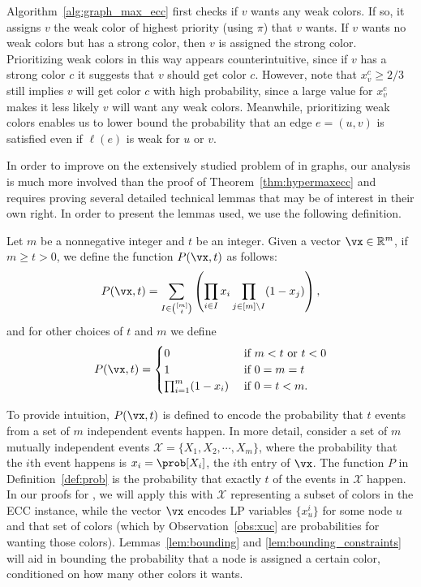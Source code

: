 Algorithm~\ref{alg:graph_max_ecc} first checks if $v$ wants any {weak} colors. If so, it assigns $v$ the weak color of highest priority (using $\pi$) that $v$ wants. If $v$ wants no weak colors but has a strong color, then $v$ is assigned the strong color. Prioritizing weak colors in this way appears counterintuitive, since if $v$ has a strong color $c$ it suggests that $v$ should get color $c$. However, note that $x_v^c \geq 2/3$ still implies $v$ will get color $c$ with high probability, since a large value for $x_v^c$ makes it less likely $v$ will want any weak colors. Meanwhile, prioritizing weak colors enables us to lower bound the probability that an edge $e = (u,v)$ is satisfied even if $\ell(e)$ is weak for $u$ or $v$.

In order to improve on the extensively studied problem of \maxecc{} in graphs, our analysis is much more involved than the proof of Theorem~\ref{thm:hypermaxecc} and requires proving several detailed technical lemmas that may be of interest in their own right. In order to present the lemmas used, we use the following definition.

\begin{definition}
	\label{def:prob}
	Let $m$ be a nonnegative integer and $t$ be an integer. Given a vector $\vx \in \mathbb{R}^m$, if $m \geq t > 0$, we define the function $P(\vx, t)$ as follows:
	\[
		P(\vx, t) = \sum_{I \in {[m] \choose t}} \left( \prod_{i \in I} x_i \prod_{j\in [m] \setminus I} (1 - x_j) \right),
	\]
	and for other choices of $t$ and $m$ we define
	\begin{equation*}
		P(\vx, t) = \begin{cases}
			0                         & \text{ if $m < t$ or $t < 0$} \\
			1                         & \text{ if $0 = m = t$}        \\
			\prod_{i = 1}^m (1 - x_i) & \text{ if $0 = t < m$.}
		\end{cases}
	\end{equation*}
\end{definition}
To provide intuition, $P(\vx,t)$ is defined to encode the probability that $t$ events from a set of $m$ independent events happen. In more detail, consider a set of $m$ mutually independent events $\mathcal{X} = \{X_1, X_2, \cdots, X_m\}$, where the probability that the $i$th event happens is $x_i = \prob[X_i]$, the $i$th entry of $\vx$. The function $P$ in Definition~\ref{def:prob} is the probability that exactly $t$ of the events in $\mathcal{X}$ happen. In our proofs for \maxecc{}, we will apply this with $\mathcal{X}$ representing a subset of colors in the ECC instance, while the vector $\vx$ encodes LP variables $\{x_u^i\}$ for some node $u$ and that set of colors (which by Observation~\ref{obs:xuc} are probabilities for wanting those colors). Lemmas~\ref{lem:bounding} and \ref{lem:bounding_constraints} will aid in bounding the probability that a node is assigned a certain color, conditioned on how many other colors it wants.


